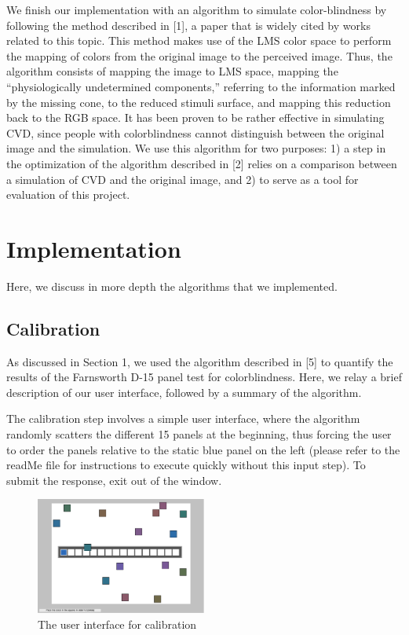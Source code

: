 \documentclass[10pt,twocolumn,letterpaper]{article}
\begin{document}
	We finish our implementation with an algorithm to simulate color-blindness by following the method described in [1], a paper that is widely cited by works related to this topic. This method makes use of the LMS color space to perform the mapping of colors from the original image to the perceived image. Thus, the algorithm consists of mapping the image to LMS space, mapping the “physiologically undetermined components,” referring to the information marked by the missing cone, to the reduced stimuli surface, and mapping this reduction back to the RGB space. It has been proven to be rather effective in simulating CVD, since people with colorblindness cannot distinguish between the original image and the simulation. We use this algorithm for two purposes: 1) a step in the optimization of the algorithm described in [2] relies on a comparison between a simulation of CVD and the original image, and 2) to serve as a tool for evaluation of this project. 

\section{Implementation}

Here, we discuss in more depth the algorithms that we implemented.

\subsection{Calibration}

As discussed in Section 1, we used the algorithm described in [5] to quantify the results of the Farnsworth D-15 panel test for colorblindness. Here, we relay a brief description of our user interface, followed by a summary of the algorithm.

The calibration step involves a simple user interface, where the algorithm randomly scatters the different 15 panels at the beginning, thus forcing the user to order the panels relative to the static blue panel on the left (please refer to the readMe file for instructions to execute quickly without this input step). To submit the response, exit out of the window.

\begin{figure}[h]
  \includegraphics[width=0.5\textwidth]{panel.png}
  \caption{The user interface for calibration}
  \label{fig:panel}
\end{figure}
\end{document}
